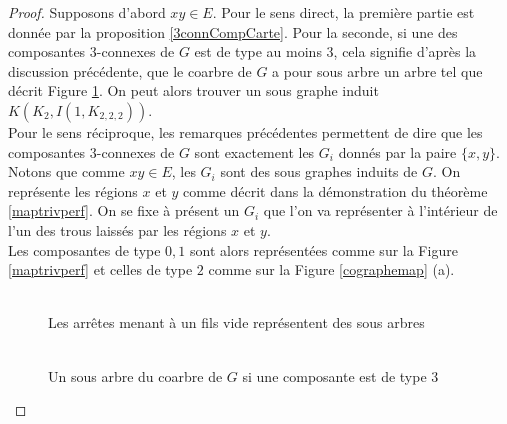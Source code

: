 \documentclass{scrartcl}
\begin{document}
\begin{flushleft}
\begin{proof}
    Supposons d'abord $xy \in E$. Pour le sens direct, la première partie est donnée par la proposition \ref{3connCompCarte}. Pour la seconde,
    si une des composantes $3$-connexes de $G$ est de type au moins $3$, cela signifie d'après la discussion précédente, que le coarbre de $G$
    a pour sous arbre un arbre tel que décrit Figure \ref{3conntype3}. On peut alors trouver un sous graphe induit $K(K_2, I(1, K_{2,2,2}))$.\\
    Pour le sens réciproque, les remarques précédentes permettent de dire que les composantes $3$-connexes de $G$ sont exactement les $G_i$
    donnés par la paire $\{x,y\}$. Notons que comme $xy \in E$, les $G_i$ sont des sous graphes induits de $G$. On représente les régions $x$ et
    $y$ comme décrit dans la démonstration du théorème \ref{maptrivperf}. On se fixe à présent un $G_i$ que l'on va représenter à l'intérieur de
    l'un des trous laissés par les régions $x$ et $y$.\\
    Les composantes de type $0,1$ sont alors représentées comme sur la Figure \ref{maptrivperf} et celles de type $2$ comme sur la
    Figure \ref{cographemap} (a).
    \\~\\

    \begin{figure}[h]
        \caption{Un sous arbre du coarbre de $G$ si une composante est de type $3$}\label{3conntype3}
        \begin{center}
            Les arrêtes menant à un fils vide représentent des sous arbres
            \\~\\
\end{center}
\end{figure}
\end{proof}
\end{flushleft}
\end{document}
